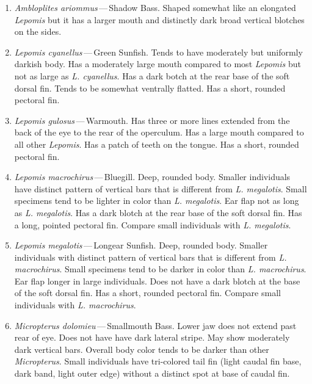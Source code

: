 \documentclass[11pt]{article}
\begin{document}
\begin{enumerate}
	\item\textit{Ambloplites ariommus}\,—\,Shadow Bass. Shaped somewhat like an elongated \textit{Lepomis} but it has a larger mouth and distinctly dark broad vertical blotches on the sides.

	\item\textit{Lepomis cyanellus}\,—\,Green Sunfish. Tends to have moderately but uniformly darkish body. Has a moderately large mouth compared to most \textit{Lepomis} but not as large as \textit{L. cyanellus}. Has a dark botch at the rear base of the soft dorsal fin. Tends to be somewhat ventrally flatted. Has a short, rounded pectoral fin.

	\item\textit{Lepomis gulosus}\,—\,Warmouth. Has three or more lines extended from the back of the eye to the rear of the operculum. Has a large mouth compared to all other \textit{Lepomis}. Has a patch of teeth on the tongue. Has a short, rounded pectoral fin.

	\item\textit{Lepomis macrochirus}\,—\,Bluegill. Deep, rounded body. Smaller individuals have distinct pattern of vertical bars that is different from \textit{L. megalotis}. Small specimens tend to be lighter in color than \textit{L. megalotis}. Ear flap not as long as \textit{L. megalotis}. Has a dark blotch at the rear base of the soft dorsal fin. Has a long, pointed pectoral fin. Compare small individuals with \textit{L. megalotis}.

	\item\textit{Lepomis megalotis}\,—\,Longear Sunfish. Deep, rounded body. Smaller individuals with distinct pattern of vertical bars that is different from \textit{L. macrochirus}. Small specimens tend to be darker in color than \textit{L. macrochirus}. Ear flap longer in large individuals. Does not have a dark blotch at the base of the soft dorsal fin. Has a short, rounded pectoral fin. Compare small individuals with \textit{L. macrochirus}.

	\item\textit{Micropterus dolomieu}\,—\,Smallmouth Bass. Lower jaw does not extend past rear of eye. Does not have have dark lateral stripe. May show moderately dark vertical bars. Overall body color tends to be darker than other \textit{Micropterus}. Small individuals have tri-colored tail fin (light caudal fin base, dark band, light outer edge) without a distinct spot at base of caudal fin.


\end{enumerate}
\end{document}
